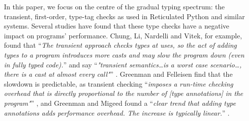 





In this paper, we focus on the centre of the gradual typing
spectrum: the transient, first-order, type-tag checks as used in
Reticulated Python and similar systems. 
Several studies have found
that these type checks have a negative impact on programs'
performance.
Chung, Li, Nardelli and Vitek, for example, found that 
``\textit{The transient approach checks types at uses, so the act of
  adding types to a program introduces more casts and may slow the
  program down (even in fully typed code).}'' and say 
``\textit{"transient semantics\ldots is a worst case scenario\ldots,
  there is a cast at almost every call"}'' \cite{kafka18}.
Greenman and Felleisen find that the slowdown is predictable, as
transient checking ``\textit{imposes a run-time checking overhead that
  is directly proportional to the number of [type annotations] in
  the program"}'' \cite{bensurvey18icfp}, and 
Greenman and Migeed found a ``\textit{clear trend
that adding type annotations adds performance overhead. The increase
is typically linear.}'' \cite{Greenman2018}.  


